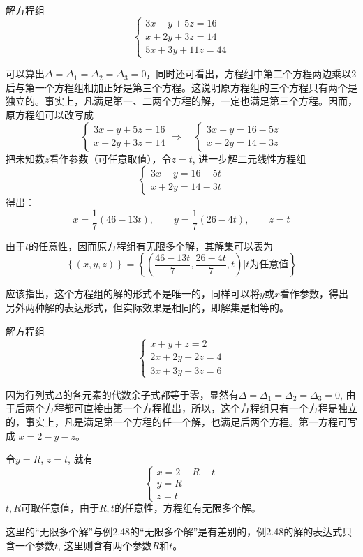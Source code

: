 \begin{example}
    解方程组
    \[\begin{cases}
        3x-y+5z=16\\
        x+2y+3z=14\\
        5x+3y+11z=44
    \end{cases}\]
\end{example}

\begin{solution}
    可以算出$\Delta=\Delta_1=\Delta_2=\Delta_3=0$，同时还可看出，方程组中第二个方程两边乘以2后与第一个方程组相加正好是第三个方程。这说明原方程组的三个方程只有两个是独立的。事实上，凡满足第一、二两个方程的解，一定也满足第三个方程。因而，原方程组可以改写成
    \[\begin{cases}
        3x-y+5z=16\\x+2y+3z=14
    \end{cases}\Rightarrow\quad \begin{cases}
        3x-y=16-5z\\x+2y=14-3z
    \end{cases}\]
    把未知数$z$看作参数（可任意取值），令$z=t$, 进一步解二元线性方程组
    \[\begin{cases}
        3x-y=16-5t\\x+2y=14-3t
    \end{cases}\]
    得出：
\[x=\frac{1}{7}(46-13t),\qquad y=\frac{1}{7}(26-4t),\qquad z=t\]

    由于$t$的任意性，因而原方程组有无限多个解，其解集可以表为
\[\left\{(x,y,z)\right\}=\left\{\left(\frac{46-13t}{7},\frac{26-4t}{7},t\right)\Big|\text{$t$为任意值}\right\}\]
\end{solution}

应该指出，这个方程组的解的形式不是唯一的，同样可以将$y$或$x$看作参数，得出另外两种解的表达形式，但实际效果是相同的，即解集是相等的。



\begin{example}
    解方程组
\[\begin{cases}
    x+y+z=2\\
    2x+2y+2z=4\\
    3x+3y+3z=6
\end{cases}\]
\end{example}

\begin{solution}
因为行列式$\Delta$的各元素的代数余子式都等于零，显然有$\Delta=\Delta_1=\Delta_2=\Delta_3=0$, 由于后两个方程都可直接由第一个方程推出，所以，这个方程组只有一个方程是独立的，事实上，凡是满足第一个方程的任一个解，也满足后两个方程。第一方程可写成
$x=2-y-z$。

令$y=R$, $z=t$, 就有
\[\begin{cases}
    x=2-R-t\\ y=R\\ z=t 
\end{cases}\]
$t,R$可取任意值，由于$R,t$的任意性，方程组有无限多个解。

这里的“无限多个解”与例2.48的“无限多个解”是有差别的，例2.48的解的表达式只含一个参数$t$, 这里则含有两个参数$R$和$t$。   
\end{solution}

